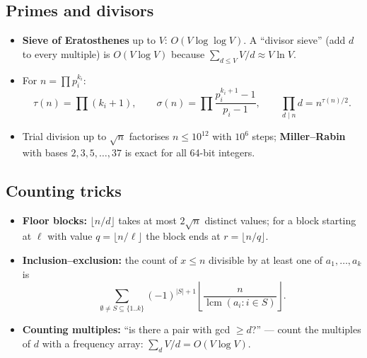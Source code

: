 \subsection*{Primes and divisors}

\begin{itemize}
  \item \textbf{Sieve of Eratosthenes} up to $V$: $O(V\log\log V)$.
        A ``divisor sieve'' (add $d$ to every multiple) is $O(V\log V)$
        because $\sum_{d\le V}V/d\approx V\ln V$.
  \item For $n=\prod p_i^{k_i}$:
        \[
          \tau(n)=\prod(k_i+1),\qquad
          \sigma(n)=\prod\frac{p_i^{k_i+1}-1}{p_i-1},\qquad
          \prod_{d\mid n}d=n^{\tau(n)/2}.
        \]
  \item Trial division up to $\sqrt n$ factorises $n\le10^{12}$ with
        $10^6$ steps; \textbf{Miller--Rabin} with bases
        $2,3,5,\dots,37$ is exact for all 64-bit integers.
\end{itemize}

\subsection*{Counting tricks}

\begin{itemize}
  \item \textbf{Floor blocks:} $\lfloor n/d\rfloor$ takes at most
        $2\sqrt n$ distinct values; for a block starting at $\ell$ with value
        $q=\lfloor n/\ell\rfloor$ the block ends at $r=\lfloor n/q\rfloor$.
  \item \textbf{Inclusion--exclusion:} the count of $x\le n$ divisible by at
        least one of $a_1,\dots,a_k$ is
        \[
          \sum_{\emptyset\ne S\subseteq\{1..k\}}(-1)^{|S|+1}
          \left\lfloor\frac{n}{\operatorname{lcm}(a_i: i\in S)}\right\rfloor .
        \]
  \item \textbf{Counting multiples:} ``is there a pair with gcd $\ge d$?''
        --- count the multiples of $d$ with a frequency array:
        $\sum_d V/d=O(V\log V)$.
\end{itemize}

\begin{center}
\end{center}

